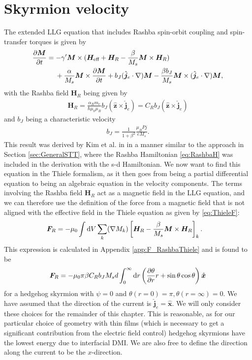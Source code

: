 \section{Skyrmion velocity}
The extended LLG equation that includes Rashba spin-orbit coupling and spin-transfer torques is given by
\begin{align}
\nonumber \frac{\partial \mathbold{M}}{\partial t} &= -\gamma'\mathbold{M}\times(\mathbold{H}_{\text{eff}}+\mathbold{H}_R-\frac{\beta}{M_s} \mathbold{M}\times\mathbold{H}_R) \\
&\hspace{4.5mm}+\frac{\alpha}{M_s}\mathbold{M}\times\frac{\partial\mathbold{M}}{\partial t} + b_J (\mathbold{\hat{j}}_e\cdot\mathbold{\nabla})\mathbold{M} - \frac{\beta b_J}{M_s} \mathbold{M}\times(\mathbold{\hat{j}}_e\cdot\mathbold{\nabla})\mathbold{M}, 
\label{eq:LLG_EC}
\end{align}
with the Rashba field $\mathbold{H}_R$ being given by
\begin{align}
\mathbold{H}_R = \frac{\alpha_R m_e}{\hbar \mu_0\mu_B}b_J (\mathbold{\hat{z}}\times\mathbold{\hat{j}}_e) = C_R b_J (\mathbold{\hat{z}}\times\mathbold{\hat{j}}_e)
\end{align}
and $b_J$ being a characteristic velocity
\begin{align}
    b_J = \frac{1}{1+\beta^2}\frac{\mu_B P j}{e M_s}.
\end{align}
This result was derived by Kim et al. in \cite{Kim2012} in a manner similar to the approach in Section \ref{sec:GeneralSTT}, where the Rashba Hamiltonian \eqref{eq:RashbaH} was included in the derivation with the s-d Hamiltonian. We now want to find this equation in the Thiele formalism, as it then goes from being a partial differential equation to being an algebraic equation in the velocity components. The terms involving the Rashba field $\mathbold{H}_R$ act as a magnetic field in the LLG equation, and we can therefore use the definition of the force from a magnetic field that is not aligned with the effective field in the Thiele equation as given by \eqref{eq:ThieleF}:
\begin{align}
\mathbold{F}_R &= -\mu_0\int \d V\sum_k (\mathbold{\nabla}M_k)\left[\mathbold{H}_R - \frac{\beta}{M_s}\mathbold{M}\times\mathbold{H}_R\right]_k.
\end{align}
This expression is calculated in Appendix \ref{app:F_RashbaThiele} and is found to be
\begin{align}
\mathbold{F}_R = -\mu_0 \pi\beta C_R b_J M_s d \int_0^{\infty} \d r \left(\frac{\partial \theta}{\partial r} r + \sin\theta\cos\theta \right) \mathbold{\hat{x}}
\end{align}
for a hedgehog skyrmion with $\psi = 0$ and $\theta(r=0)=\pi, \theta(r=\infty)=0$. We have assumed that the direction of the current is $\mathbold{\hat{j}}_e = \mathbold{\hat{x}}$. We will only consider these choices for the remainder of this chapter. This is reasonable, as for our particular choice of geometry with thin films (which is necessary to get a significant contribution from the electric field control) hedgehog skyrmions have the lowest energy due to interfacial DMI. We are also free to define the direction along the current to be the $x$-direction.

